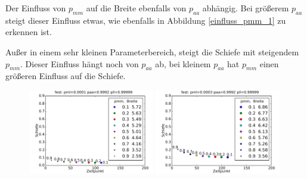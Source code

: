 Der Einfluss von $p_{mm}$ auf die Breite ebenfalls von $p_{aa}$ abhängig. Bei größerem $p_{aa}$ steigt dieser Einfluss etwas, wie ebenfalls in Abbildung \ref{einfluss_pmm_1} zu erkennen ist.


Außer in einem sehr kleinen Parameterbereich, steigt die Schiefe mit steigendem $p_{mm}$. Dieser Einfluss hängt noch von $p_{aa}$ ab, bei kleinem $p_{aa}$ hat $p_{mm}$ einen größeren Einfluss auf die Schiefe.

\begin{figure}[h]
\includegraphics[width=0.49\textwidth]{bilder/pmm/3fest_p_00001_09992_099999}
\includegraphics[width=0.49\textwidth]{bilder/pmm/3fest_p_00003_09992_099999}

\vspace*{5pt}


\end{figure}
